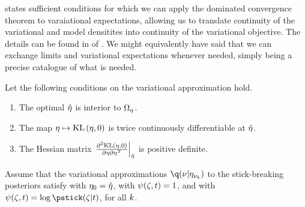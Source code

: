  states sufficient conditions for which we can apply the
dominated convergence theorem to varaiational expectations, allowing us to
translate continuity of the variational and model densitites into continuity of
the variational objective.  The details can be found in  of .  We might equivalently have said that
we can exchange limits and variational expectations whenever needed,
 simply being a precise catalogue of what is needed.


\begin{assu}
%
Let the following conditions on the variational approximation hold.
%
\begin{enumerate}
%
    \item {} The optimal $\hat\eta$ is interior
    to $\Omega_{\eta}$.

    \item {} The map $\eta \mapsto \mathrm{KL}\left(\eta, 0\right)$ is twice
    continuously differentiable at $\hat\eta$.

    \item{} The Hessian matrix $\left.\frac{\partial^2 \mathrm{KL}\left(\eta,
    0\right)}{\partial \eta \partial \eta^T}\right\vert_{\hat\eta}$ is positive definite.
%
\end{enumerate}
%
\end{assu}

\begin{assu}
%
Assume that the variational approximations $\q(\nu \vert \etanuk)$ to the
stick-breaking posteriors satisfy  with $\eta_0 =
\hat\eta$, with $\psi(\zeta, t) = 1$, and with $\psi(\zeta, \t) = \log
\pstick(\zeta \vert \t)$, for all $k$.
%
\end{assu}

